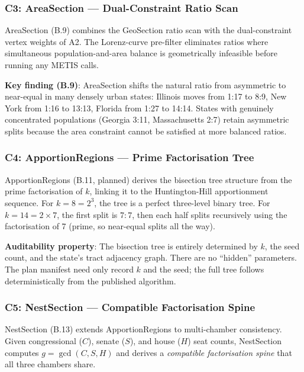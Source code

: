 \subsubsection*{C3: AreaSection --- Dual-Constraint Ratio Scan}

AreaSection (B.9) combines the GeoSection ratio scan with the dual-constraint
vertex weights of A2.
The Lorenz-curve pre-filter eliminates ratios where simultaneous population-and-area
balance is geometrically infeasible before running any METIS calls.

\textbf{Key finding (B.9)}: AreaSection shifts the natural ratio from asymmetric
to near-equal in many densely urban states: Illinois moves from 1:17 to 8:9,
New York from 1:16 to 13:13, Florida from 1:27 to 14:14.
States with genuinely concentrated populations (Georgia 3:11, Massachusetts 2:7)
retain asymmetric splits because the area constraint cannot be satisfied at
more balanced ratios.

\subsubsection*{C4: ApportionRegions --- Prime Factorisation Tree}

ApportionRegions (B.11, planned) derives the bisection tree structure from the
prime factorisation of $k$, linking it to the Huntington-Hill apportionment
sequence.
For $k = 8 = 2^3$, the tree is a perfect three-level binary tree.
For $k = 14 = 2 \times 7$, the first split is $7:7$, then each half splits
recursively using the factorisation of 7 (prime, so near-equal splits all the
way).

\textbf{Auditability property}: The bisection tree is entirely determined by
$k$, the seed count, and the state's tract adjacency graph.
There are no ``hidden'' parameters.
The plan manifest need only record $k$ and the seed; the full tree follows
deterministically from the published algorithm.

\subsubsection*{C5: NestSection --- Compatible Factorisation Spine}

NestSection (B.13) extends ApportionRegions to multi-chamber consistency.
Given congressional ($C$), senate ($S$), and house ($H$) seat counts,
NestSection computes $g = \gcd(C, S, H)$ and derives a \emph{compatible
factorisation spine} that all three chambers share.

